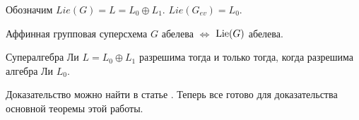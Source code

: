 \begin{lemma}\label{Lie(Gev) = L_0}
  Обозначим $ Lie(G) = L = L_0 \oplus L_1 $. $ Lie(G_{ev}) = L_0 $.
  \proof {
    \qedhere
  }
\end{lemma}

\begin{lemma} \label{abelian G and Lie(G)}
  Аффинная групповая суперсхема $ G $ абелева $ \iff $ $ \mathrm{Lie}(G) $ абелева.
\end{lemma}

\begin{theorem}[Кац] \label{kac}
  Супералгебра Ли $ L = L_0 \oplus L_1 $ разрешима тогда и только тогда,
  когда разрешима алгебра Ли $ L_0 $.
\end{theorem}
Доказательство можно найти в статье \cite{kac}. Теперь все готово
для доказательства основной теоремы этой работы.

